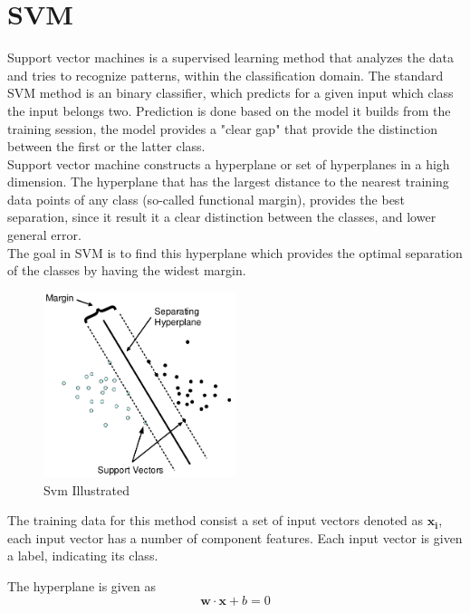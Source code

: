 \section{SVM}
Support vector machines is a supervised learning method that analyzes the data and tries to recognize patterns, within the classification domain. The standard SVM method is an binary classifier, which predicts for a given input which class the input belongs two. Prediction is done based on the model it builds from the training session, the model provides a "clear gap" that provide the distinction between the first or the latter class. \\

Support vector machine constructs a hyperplane or set of hyperplanes in a high dimension. The hyperplane that has the largest distance to the nearest training data points of any class (so-called functional margin), provides the best separation,  since it result it a clear distinction between the classes, and lower general error.
\\

The goal in SVM is to find this hyperplane which provides the optimal separation of the classes by having the widest margin. 

\begin{figure}[H]
\centering
\includegraphics[width = 0.5\textwidth]{img/SVM-illu.png}
\caption{Svm Illustrated}
\label{fig::SVM-illustrated}
\end{figure}

The training data for this method consist a set of input vectors denoted as $\mathbf{x_i}$, each input vector has a number of component features. Each input vector is given a label, indicating its class.

The hyperplane is given as 
\begin{equation}
\mathbf{w} \cdot \mathbf{x} + b = 0
\end{equation}

